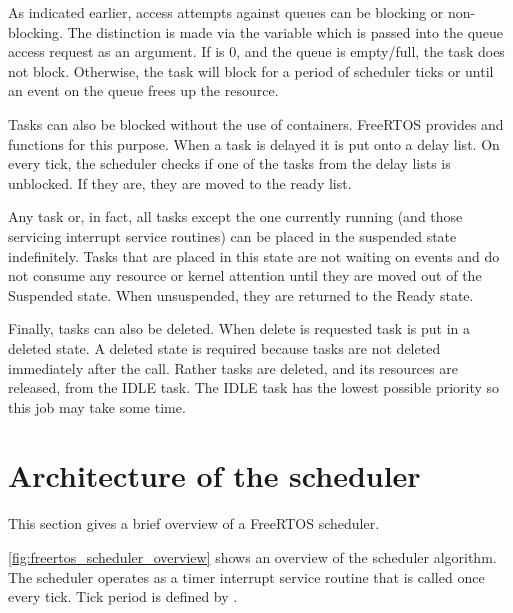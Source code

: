 As indicated earlier, access attempts against queues can be blocking or non-blocking.
The distinction is made via the  variable which is passed into the queue
access request as an argument. If  is 0, and the queue is empty/full, the
task does not block. Otherwise, the task will block for a period of 
scheduler ticks or until an event on the queue frees up the resource.

Tasks can also be blocked without the use of containers. FreeRTOS provides  and  functions for this purpose. When a task is delayed it is put onto a delay list. On every tick, the scheduler checks if one of the tasks from the delay lists is unblocked. If they are, they are moved to the ready list.

Any task or, in fact, all tasks except the one currently running (and those servicing interrupt service routines)
can be placed in the suspended state indefinitely. Tasks that are placed in this state are
not waiting on events and do not consume any resource or kernel attention until they are
moved out of the Suspended state. When unsuspended, they are returned to the Ready state.

Finally, tasks can also be deleted. When delete is requested task is put in a deleted state. A deleted state is required because tasks are not deleted immediately after the call. Rather tasks are deleted, and its resources are released, from the IDLE task. The IDLE task has the lowest possible priority so this job may take some time.

\section{Architecture of the scheduler}

This section gives a brief overview of a FreeRTOS scheduler.

\autoref{fig:freertos_scheduler_overview} shows an overview of the scheduler algorithm. The scheduler operates as a timer interrupt service routine that is called once every tick. Tick period is defined by . 

